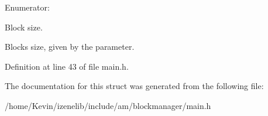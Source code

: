 \begin{Desc}
\item[Enumerator: ]\par
\begin{description}
\item[{\em 
\hypertarget{structBID_c0031771196a42b2015dff3c779daf7149b29a3349c693e4d54ccd538fa65fbb}{
size}
\label{structBID_c0031771196a42b2015dff3c779daf7149b29a3349c693e4d54ccd538fa65fbb}
}]Block size. \item[{\em 
\hypertarget{structBID_gc0031771196a42b2015dff3c779daf713ab3777c88d3151437be65ed9116a034}{
t\_\-size}
\label{structBID_gc0031771196a42b2015dff3c779daf713ab3777c88d3151437be65ed9116a034}
}]Blocks size, given by the parameter. \end{description}
\end{Desc}



Definition at line 43 of file main.h.

The documentation for this struct was generated from the following file:\begin{CompactItemize}
\item 
/home/Kevin/izenelib/include/am/blockmanager/main.h\end{CompactItemize}
